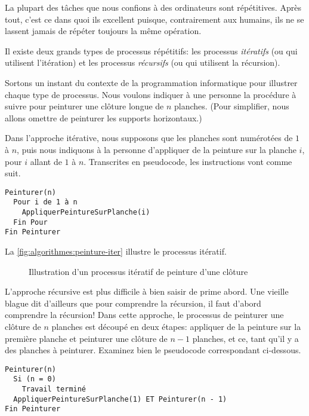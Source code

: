 La plupart des tâches que nous confions à des ordinateurs sont
répétitives. Après tout, c'est ce dans quoi ils excellent puisque,
contrairement aux humains, ils ne se lassent jamais de répéter
toujours la même opération.

Il existe deux grands types de processus répétitifs: les processus
\emph{itératifs} (ou qui utilisent
l'itération) et les processus
\emph{récursifs} (ou qui utilisent la
récursion).

Sortons un instant du contexte de la programmation informatique pour
illustrer chaque type de processus. Nous voulons indiquer à une
personne la procédure à suivre pour peinturer une clôture longue de
$n$ planches. (Pour simplifier, nous allons omettre de peinturer les
supports horizontaux.)

Dans l'approche itérative, nous supposons que les planches sont
numérotées de $1$ à $n$, puis nous indiquons à la personne d'appliquer
de la peinture sur la planche $i$, pour $i$ allant de $1$ à $n$.
Transcrites en pseudocode, les instructions vont comme suit.
\begin{Schunk}
\begin{Verbatim}
Peinturer(n)
  Pour i de 1 à n
    AppliquerPeintureSurPlanche(i)
  Fin Pour
Fin Peinturer
\end{Verbatim}
\end{Schunk}

La \autoref{fig:algorithmes:peinture-iter} illustre le processus itératif.

\begin{figure}
  \centering
  \setlength{\unitlength}{0.99mm}
  
  
  
  \caption{Illustration d'un processus itératif de peinture d'une
    clôture}
  \label{fig:algorithmes:peinture-iter}
\end{figure}

L'approche récursive est plus difficile à bien saisir de prime abord.
Une vieille blague dit d'ailleurs que pour comprendre la récursion, il
faut d'abord comprendre la récursion! Dans cette approche, le
processus de peinturer une clôture de $n$ planches est découpé en deux
étapes: appliquer de la peinture sur la première planche et peinturer
une clôture de $n - 1$ planches, et ce, tant qu'il y a des planches à
peinturer. Examinez bien le pseudocode correspondant ci-dessous.
\begin{Schunk}
\begin{Verbatim}
Peinturer(n)
  Si (n = 0)
    Travail terminé
  AppliquerPeintureSurPlanche(1) ET Peinturer(n - 1)
Fin Peinturer
\end{Verbatim}
\end{Schunk}

